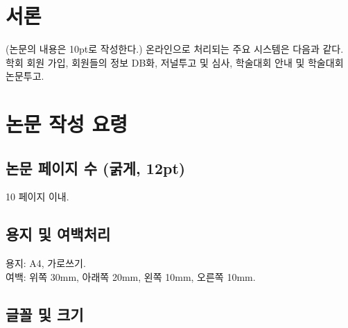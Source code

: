 \documentclass[a4paper,twocolumn]{article}
\begin{document}
%
%


\maketitle


\section{서론}
\label{sec:introduction}
(논문의 내용은 10pt로 작성한다.)
온라인으로 처리되는 주요 시스템은 다음과 같다.
학회 회원 가입, 회원들의 정보 DB화, 저널투고 및 심사, 
학술대회 안내 및 학술대회 논문투고.


\section{논문 작성 요령}
\label{sec:paper_writing_technique}


\subsection{논문 페이지 수 (굵게, 12pt)}
\label{subsec:paper_page_num}

10 페이지 이내.


\subsection{용지 및 여백처리}
\label{subsec:paper_and_margin}

용지: A4, 가로쓰기. \\
여백: 위쪽 30mm, 아래쪽 20mm, 왼쪽 10mm, 오른쪽 10mm.


\subsection{글꼴 및 크기}
\label{subsec:paper_font}
\end{document}
